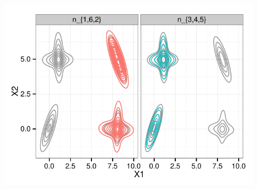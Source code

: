 \begin{frame}[t]
\begin{columns}[T]
\includegraphics[height=0.2\textheight]{static_figures/baudry_ex4_1_all_distributions_2c.pdf}
\end{columns}
\end{frame}

